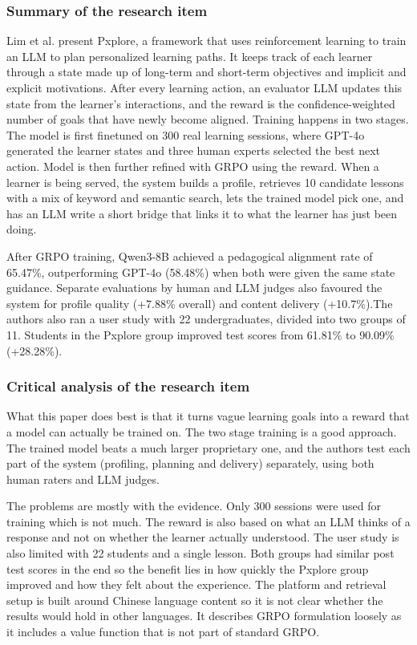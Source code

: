 \documentclass{FastFyp}
\begin{document}
\subsubsection{Summary of the research item}
Lim et al. \cite{lim2026pxplore} present Pxplore, a framework that uses reinforcement learning to train an LLM to plan personalized learning paths. It keeps track of each learner through a state made up of long-term and short-term objectives and implicit and explicit motivations. After every learning action, an evaluator LLM updates this state from the learner's interactions, and the reward is the confidence-weighted number of goals that have newly become aligned. Training happens in two stages. The model is first finetuned on 300 real learning sessions, where GPT-4o generated the learner states and three human experts selected the best next action. Model is then further refined with GRPO \cite{shao2024deepseekmath} using the reward. When a learner is being served, the system builds a profile, retrieves 10 candidate lessons with a mix of keyword and semantic search, lets the trained model pick one, and has an LLM write a short bridge that links it to what the learner has just been doing.

After GRPO training, Qwen3-8B achieved a pedagogical alignment rate of 65.47\%, outperforming GPT-4o (58.48\%) when both were given the same state guidance. Separate evaluations by human and LLM judges also favoured the system for profile quality (+7.88\% overall) and content delivery (+10.7\%).The authors also ran a user study with 22 undergraduates, divided into two groups of 11. Students in the Pxplore group improved test scores from 61.81\% to 90.09\% (+28.28\%).

\subsubsection{Critical analysis of the research item}
What this paper does best is that it turns vague learning goals into a reward that a model can actually be trained on. The two stage training is a good approach. The trained model beats a much larger proprietary one, and the authors test each part of the system (profiling, planning and delivery) separately, using both human raters and LLM judges. 

The problems are mostly with the evidence. Only 300 sessions were used for training which is not much. The reward is also based on what an LLM thinks of a response and not on whether the learner actually understood. The user study is also limited with 22 students and a single lesson. Both groups had similar post test scores in the end so the benefit lies in how quickly the Pxplore group improved and how they felt about the experience. The platform and retrieval setup is built around Chinese language content so it is not clear whether the results would hold in other languages. It describes GRPO formulation loosely as it includes a value function that is not part of standard GRPO.
\end{document}

